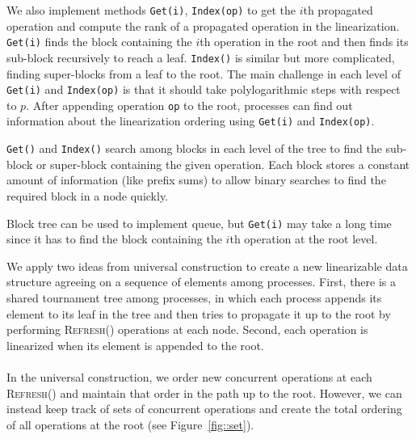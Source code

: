 \documentclass[10pt]{article}
\theoremstyle{definition}
\begin{document}
We also implement methods \texttt{Get(i)}, \texttt{Index(op)} to get the $i$th propagated operation and compute the rank of a propagated operation in the linearization. \texttt{Get(i)} finds the block containing the $i$th operation in the root and then finds its sub-block recursively to reach a leaf. \texttt{Index()} is  similar but more complicated, finding super-blocks from a leaf to the root. The main challenge in each level of \texttt{Get(i)} and \texttt{Index(op)} is that it should take polylogarithmic steps with respect to $p$. After appending operation \texttt{op} to the root, processes can find out information about the linearization ordering using \texttt{Get(i)} and \texttt{Index(op)}. 

\texttt{Get()} and \texttt{Index()} search among blocks in each level of the tree to find the sub-block or super-block containing the given operation. Each block stores a constant amount of information (like prefix sums) to allow binary searches to find the required block in a node quickly.

Block tree can be used to implement queue, but \texttt{Get(i)}  may take a long time since it has to find the block containing the $i$th operation at the root level.



We apply two ideas from universal construction to create a new linearizable data structure agreeing on a sequence of elements among processes. First, there is a shared tournament tree among processes, in which each process appends its element to its leaf in the tree and then tries to propagate it up to the root by performing \textsc{Refresh()} operations at each node. Second, each operation is linearized when its element is appended to the root.



\paragraph{}
 In the universal construction, we order new concurrent operations at each \textsc{Refresh}() and maintain that order in the path up to the root. However, we can instead keep track of sets of concurrent operations and create the total ordering of all operations at the root (see Figure~\ref{fig::set}).
 
\end{document}
